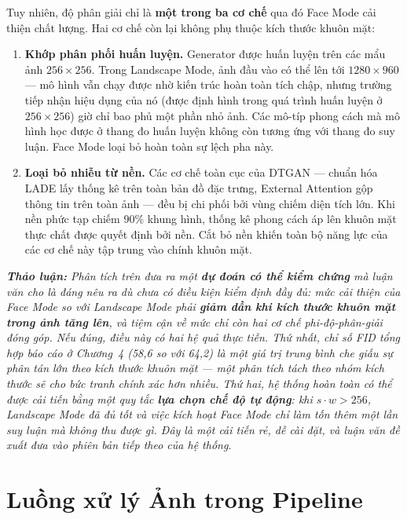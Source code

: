 Tuy nhiên, độ phân giải chỉ là \textbf{một trong ba cơ chế} qua đó Face Mode cải thiện chất lượng. Hai cơ chế còn lại không phụ thuộc kích thước khuôn mặt:

\begin{enumerate}
    \item \textbf{Khớp phân phối huấn luyện.} Generator được huấn luyện trên các mẩu ảnh $256\times256$. Trong Landscape Mode, ảnh đầu vào có thể lên tới $1280 \times 960$ --- mô hình vẫn chạy được nhờ kiến trúc hoàn toàn tích chập, nhưng trường tiếp nhận hiệu dụng của nó (được định hình trong quá trình huấn luyện ở $256\times256$) giờ chỉ bao phủ một phần nhỏ ảnh. Các mô-típ phong cách mà mô hình học được ở thang đo huấn luyện không còn tương ứng với thang đo suy luận. Face Mode loại bỏ hoàn toàn sự lệch pha này.
    \item \textbf{Loại bỏ nhiễu từ nền.} Các cơ chế toàn cục của DTGAN --- chuẩn hóa LADE lấy thống kê trên toàn bản đồ đặc trưng, External Attention gộp thông tin trên toàn ảnh --- đều bị chi phối bởi vùng chiếm diện tích lớn. Khi nền phức tạp chiếm 90\% khung hình, thống kê phong cách áp lên khuôn mặt thực chất được quyết định bởi nền. Cắt bỏ nền khiến toàn bộ năng lực của các cơ chế này tập trung vào chính khuôn mặt.
\end{enumerate}

\medskip
\noindent\textit{\textbf{Thảo luận:} Phân tích trên đưa ra một \textbf{dự đoán có thể kiểm chứng} mà luận văn cho là đáng nêu ra dù chưa có điều kiện kiểm định đầy đủ: mức cải thiện của Face Mode so với Landscape Mode phải \textbf{giảm dần khi kích thước khuôn mặt trong ảnh tăng lên}, và tiệm cận về mức chỉ còn hai cơ chế phi-độ-phân-giải đóng góp. Nếu đúng, điều này có hai hệ quả thực tiễn. Thứ nhất, chỉ số FID tổng hợp báo cáo ở Chương~4 (58,6 so với 64,2) là một giá trị trung bình che giấu sự phân tán lớn theo kích thước khuôn mặt --- một phân tích tách theo nhóm kích thước sẽ cho bức tranh chính xác hơn nhiều. Thứ hai, hệ thống hoàn toàn có thể được cải tiến bằng một quy tắc \textbf{lựa chọn chế độ tự động}: khi $s \cdot w > 256$, Landscape Mode đã đủ tốt và việc kích hoạt Face Mode chỉ làm tốn thêm một lần suy luận mà không thu được gì. Đây là một cải tiến rẻ, dễ cài đặt, và luận văn đề xuất đưa vào phiên bản tiếp theo của hệ thống.}

\section{Luồng xử lý Ảnh trong Pipeline}
\label{sec:image_pipeline}

